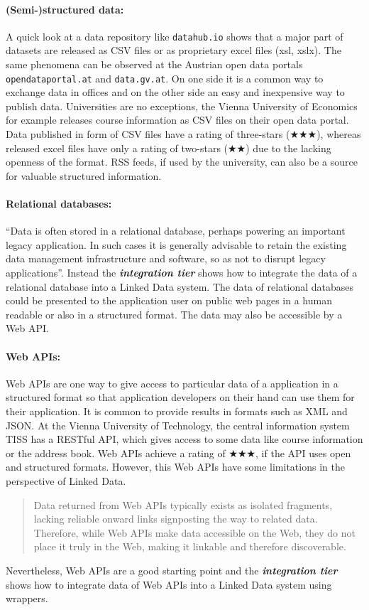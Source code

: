 \documentclass{article}
\begin{document}
\paragraph{(Semi-)structured data:} A quick look at a data repository like \texttt{datahub.io} shows that a major part of datasets are released as CSV files or as proprietary excel files (xsl, xslx). The same phenomena can be observed at the Austrian open data portals \texttt{opendataportal.at} and \texttt{data.gv.at}. On one side it is a common way to exchange data in offices and on the other side an easy and inexpensive way to publish data. Universities are no exceptions, the Vienna University of Economics for example releases course information as CSV files on their open data portal. Data published in form of CSV files have a rating of three-stars ($\bigstar\bigstar\bigstar$), whereas released excel files have only a rating of two-stars ($\bigstar\bigstar$) due to the lacking openness of the format. RSS feeds, if used by the university, can also be a source for valuable structured information.

\paragraph{Relational databases:} \enquote{Data is often stored in a relational database, perhaps powering an important legacy application. In such cases it is generally advisable to retain the existing data management infrastructure and software, so as not to disrupt legacy applications}.\cite{heath_linked_2011} Instead the \textit{\textbf{integration tier}} shows how to integrate the data of a relational database into a Linked Data system. The data of relational databases could be presented to the application user on public web pages in a human readable or also in a structured format. The data may also be accessible by a Web API.

\paragraph{Web APIs:} Web APIs are one way to give access to particular data of a application in a structured format so that application developers on their hand can use them for their application. It is common to provide results in formats such as XML and JSON. At the Vienna University of Technology, the central information system TISS has a RESTful API, which gives access to some data like course information or the address book. Web APIs achieve a rating of $\bigstar\bigstar\bigstar$, if the API uses open and structured formats. However, this Web APIs have some limitations in the perspective of Linked Data. \begin{quote}Data returned from Web APIs typically exists as isolated fragments, lacking reliable onward links signposting the way to related data. Therefore, while Web APIs make data accessible on the Web, they do not place it truly in the Web, making it linkable and therefore discoverable.\cite{heath_linked_2011} \end{quote} Nevertheless, Web APIs are a good starting point and the \textit{\textbf{integration tier}} shows how to integrate data of Web APIs into a Linked Data system using wrappers.
\end{document}
